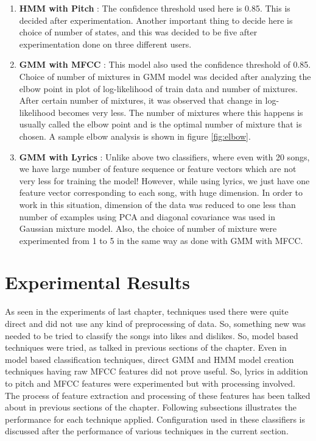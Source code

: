 \begin{enumerate}
\item \textbf{HMM with Pitch} : The confidence threshold used here is 0.85. This is decided after experimentation. Another important thing to decide here is choice of number of states, and this was decided to be five after experimentation done on three different users.
\item \textbf{GMM with MFCC} : This model also used the confidence threshold of 0.85. Choice of number of mixtures in GMM model was decided after analyzing the elbow point in plot of log-likelihood of train data and number of mixtures. After certain number of mixtures, it was observed that change in log-likelihood becomes very less. The number of mixtures where this happens is usually called the elbow point and is the optimal number of mixture that is chosen. A sample elbow analysis is shown in figure \ref{fig:elbow}.
\item \textbf{GMM with Lyrics} : Unlike above two classifiers, where even with 20 songs, we have large number of feature sequence or feature vectors which are not very less for training the model! However, while using lyrics, we just have one feature vector corresponding to each song, with huge dimension. In order to work in this situation, dimension of the data was reduced to one less than number of examples using PCA and diagonal covariance was used in Gaussian mixture model. Also, the choice of number of mixture were experimented from 1 to 5 in the same way as done with GMM with MFCC.
\end{enumerate}
\section{Experimental Results}
As seen in the experiments of last chapter, techniques used there were quite direct and did not use any kind of preprocessing of data. So, something new was needed to be tried to classify the songs into likes and dislikes. So, model based techniques were tried, as talked in previous sections of the chapter. Even in model based classification techniques, direct GMM and HMM model creation techniques having raw MFCC features did not prove useful. So, lyrics in addition to pitch and MFCC features were experimented but with processing involved. The process of feature extraction and processing of these features has been talked about in previous sections of the chapter. Following subsections illustrates the performance for each technique applied. Configuration used in these classifiers is discussed after the performance of various techniques in the current section.
